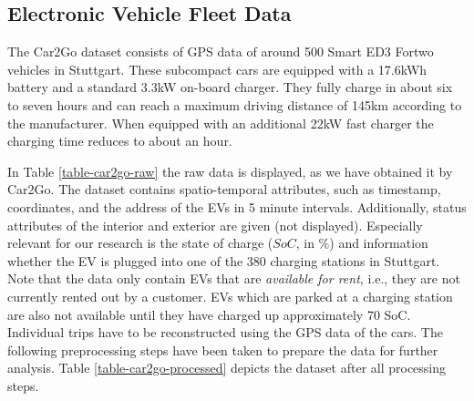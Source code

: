 \documentclass[a4paper, 12pt]{article}
\begin{document}
\subsection{Electronic Vehicle Fleet Data}
\label{sec:orgfddacdc}
The Car2Go dataset consists of GPS data of around 500 Smart ED3 Fortwo vehicles in
Stuttgart. These subcompact cars are equipped with a 17.6kWh battery and a
standard 3.3kW on-board charger. They fully charge in about six to seven hours
and can reach a maximum driving distance of 145km according to the manufacturer.
When equipped with an additional 22kW fast charger the charging time reduces to
about an hour.

In Table \ref{table-car2go-raw} the raw data is displayed, as we have obtained it
by Car2Go. The dataset contains spatio-temporal attributes, such as timestamp,
coordinates, and the address of the EVs in 5 minute intervals. Additionally,
status attributes of the interior and exterior are given (not displayed).
Especially relevant for our research is the state of charge (\(SoC\), in \%) and
information whether the EV is plugged into one of the 380 charging stations in
Stuttgart. Note that the data only contain EVs that are \emph{available for rent},
i.e., they are not currently rented out by a customer. EVs which are parked at a
charging station are also not available until they have charged up approximately
70 SoC. Individual trips have to be reconstructed using the GPS data of the
cars. The following preprocessing steps have been taken to prepare the data for
further analysis. Table \ref{table-car2go-processed} depicts the dataset after all
processing steps.
\end{document}
